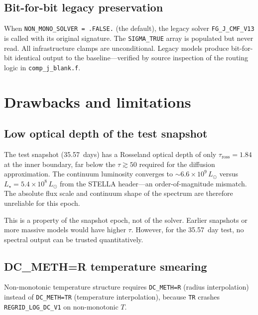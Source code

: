 \documentclass[11pt,a4paper]{article}
\begin{document}
\subsection{Bit-for-bit legacy preservation}

When \texttt{NON\_MONO\_SOLVER = .FALSE.} (the default), the legacy
solver \texttt{FG\_J\_CMF\_V13} is called with its original signature.
The \texttt{SIGMA\_TRUE} array is populated but never read.  All
infrastructure clamps are unconditional.  Legacy models produce
bit-for-bit identical output to the baseline---verified by source
inspection of the routing logic in \texttt{comp\_j\_blank.f}.

\section{Drawbacks and limitations}
\label{sec:drawbacks}

\subsection{Low optical depth of the test snapshot}

The test snapshot (35.57~days) has a Rosseland optical depth of only
$\tau_{\mathrm{ross}} = 1.84$ at the inner boundary, far below the
$\tau \gtrsim 50$ required for the diffusion approximation.  The
continuum luminosity converges to $\sim 6.6 \times 10^9\,L_\odot$ versus
$L_\star = 5.4 \times 10^8\,L_\odot$ from the STELLA header---an
order-of-magnitude mismatch.  The absolute flux scale and continuum
shape of the spectrum are therefore unreliable for this epoch.

This is a property of the snapshot epoch, not of the solver.  Earlier
snapshots or more massive models would have higher $\tau$.  However,
for the 35.57~day test, no spectral output can be trusted
quantitatively.

\subsection{DC\_METH=R temperature smearing}

Non-monotonic temperature structure requires
\texttt{DC\_METH=R} (radius interpolation) instead of \texttt{DC\_METH=TR}
(temperature interpolation), because \texttt{TR} crashes
\texttt{REGRID\_LOG\_DC\_V1} on non-monotonic $T$.
\end{document}
